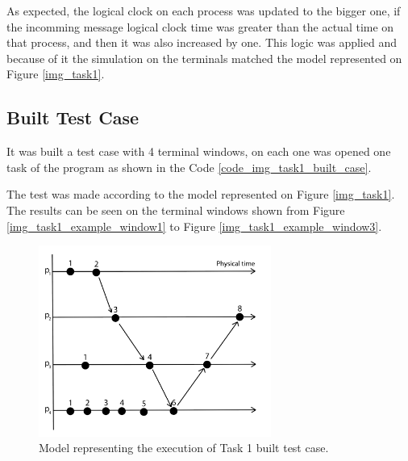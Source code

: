 \documentclass[a4paper, 11pt]{article}
\begin{document}
As expected, the logical clock on each process was updated to the bigger one, if the incomming message logical clock time was greater than the actual time on that process, and then it was also increased by one. This logic was applied and because of it the simulation on the terminals matched the model represented on Figure \ref{img_task1}.

\subsection*{Built Test Case}

It was built a test case with 4 terminal windows, on each one was opened one task of the program as shown in the Code \ref{code_img_task1_built_case}.

The test was made according to the model represented on Figure \ref{img_task1}. The results can be seen on the terminal windows shown from Figure \ref{img_task1_example_window1} to Figure \ref{img_task1_example_window3}.

\begin{figure}[h]
  \begin{center}
  \includegraphics[width=3in]{./imgs/task1_built_case_model.png}
  \caption{Model representing the execution of Task 1 built test case.}
  \label{img_task1_built_case_model}
  \end{center}
\end{figure}


\end{document}
